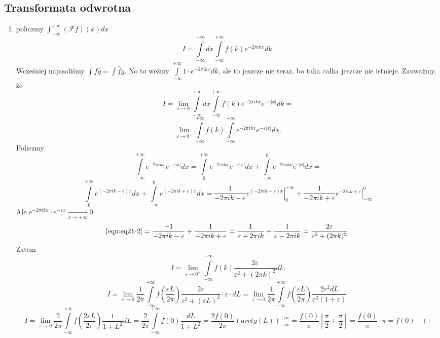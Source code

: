 \documentclass[../main.tex]{subfiles}
\begin{document}
\subsection{Transformata odwrotna}
\begin{enumerate}
    \item policzmy $\int_{-\infty}^{+\infty}\left( \mathcal{F}f \right) (x)dx$
        \[
            I = \int\limits_{-\infty}^{+\infty}dx\int\limits_{-\infty}^{+\infty}f(k)e^{-2\pi i k x}dk
        .\]
    Wcześniej napisaliśmy $\int f \hat{g} = \int \hat{f} g$. No to weźmy $\int\limits_{-\infty}^{+\infty} 1 \cdot e^{-2\pi i kx}dk$, ale to jeszcze nie teraz, bo taka całka jeszcze nie istnieje. Zauważmy, że
        \[
            I = \lim_{\varepsilon \to 0}\int\limits_{-\infty}^{+\infty}dx \int\limits_{-\infty}^{+\infty}f(k)e^{-2\pi i k x}e^{-\varepsilon|x|}dk =
        \]
    \[
        \lim_{\varepsilon \to 0^+} \int\limits_{-\infty}^{+\infty}f(k)\int\limits_{-\infty}^{+\infty}e^{-2\pi i kx}e^{-\varepsilon|x|}dx
    .\]
Policzmy
\[
    \int\limits_{-\infty}^{+\infty}e^{-2\pi i kx}e^{-\varepsilon|x|}dx = \int\limits_{0}^{+\infty}e^{-2\pi i kx}e^{-\varepsilon|x|}dx + \int\limits_{-\infty}^{0}e^{-2\pi i kx}e^{\varepsilon|x|}dx =
\]
\begin{equation}
    \label{eqn:eq21-2}
    \int\limits_{0}^{+\infty}e^{(-2\pi i k - \varepsilon)x}dx + \int\limits_{-\infty}^{0}e^{(-2\pi ik + \varepsilon)x}dx = \frac{1}{-2\pi i k -\varepsilon}\left.e^{(-2\pi i k - \varepsilon)x}\right|_{0}^{+\infty} + \frac{1}{-2\pi i k + \varepsilon}\left.e^{-2\pi ik + \varepsilon}\right|_{-\infty}^0 \tag{$\star\star$}
\end{equation}
Ale $e^{-2\pi i kx} \cdot e^{-\varepsilon x}\underset{x\to +\infty}{\longrightarrow} 0$
\[
    \eqref{eqn:eq21-2} = \frac{-1}{-2\pi i k - \varepsilon} + \frac{1}{-2 \pi i k + \varepsilon} = \frac{1}{\varepsilon + 2 \pi i k} + \frac{1}{\varepsilon - 2\pi i k} = \frac{2 \varepsilon}{\varepsilon^2 + (2\pi k)^2}
.\]
Zatem
\[
    I = \lim_{\varepsilon \to 0^+} \int\limits_{-\infty}^{+\infty}f(k) \frac{2\varepsilon}{\varepsilon^2 + (2\pi k)^2}dk
.\]
\[
    I = \lim_{\varepsilon \to 0} \frac{1}{2\pi}\int\limits_{-\infty}^{+\infty}f\left( \frac{\varepsilon L}{2\pi} \right) \frac{2 \varepsilon}{\varepsilon^2 + (\varepsilon L)^2} \cdot \varepsilon \cdot dL = \lim_{\varepsilon \to 0}\frac{1}{2\pi}\int\limits_{-\infty}^{+\infty}f\left( \frac{\varepsilon L}{2\pi} \right) \frac{2 \varepsilon^2 dL}{\varepsilon^2(1+\varepsilon)}
.\]
\[
    I = \lim_{\varepsilon \to 0}\frac{2}{2\pi }\int\limits_{-\infty}^{+\infty}f\left( \frac{2\varepsilon L}{2\pi } \right) \frac{1}{1 + L^2}dL = \frac{2}{2\pi}\int\limits_{-\infty}^{+\infty}f(0)\frac{dL}{1+L^2} = \frac{2 f(0)}{2\pi }\left( arctg(L)\right)_{-\infty}^{+\infty} = \frac{f(0)}{\pi} \left[ \frac{\pi}{2} + \frac{\pi}{2} \right] = \frac{f(0)}{\pi} \cdot \pi = f(0)\quad \Box
\]
\end{enumerate}
\end{document}
